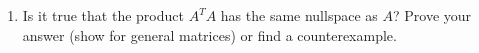 \documentclass[10pt, a4paper]{article}
\theoremstyle{break}
\begin{document}
\begin{enumerate}
\item Is it true that the product $A^TA$ has the same nullspace as $A$? Prove your answer (show for general matrices) or find a counterexample. \\
%




\end{enumerate}
\end{document}
